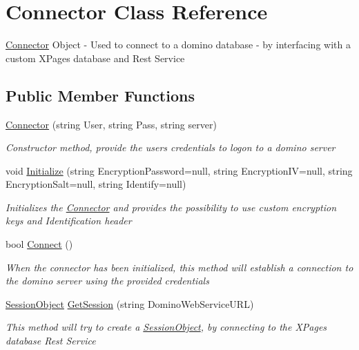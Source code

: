 \hypertarget{class_connector}{}\section{Connector Class Reference}
\label{class_connector}


\mbox{\hyperlink{class_connector}{Connector}} Object -\/ Used to connect to a domino database -\/ by interfacing with a custom X\+Pages database and Rest Service  


\subsection*{Public Member Functions}
\begin{DoxyCompactItemize}
\item 
\mbox{\hyperlink{class_connector_a259c6d94252479cc3028038ebbaa7dc8}{Connector}} (string User, string Pass, string server)
\begin{DoxyCompactList}\small\item\em Constructor method, provide the users credentials to logon to a domino server \end{DoxyCompactList}\item 
void \mbox{\hyperlink{class_connector_a2ceb19719cfc04adc4c2d299e19e1447}{Initialize}} (string Encryption\+Password=null, string Encryption\+IV=null, string Encryption\+Salt=null, string Identify=null)
\begin{DoxyCompactList}\small\item\em Initializes the \mbox{\hyperlink{class_connector}{Connector}} and provides the possibility to use custom encryption keys and Identification header \end{DoxyCompactList}\item 
bool \mbox{\hyperlink{class_connector_a0dcf8f969c37c4306c567417a872329a}{Connect}} ()
\begin{DoxyCompactList}\small\item\em When the connector has been initialized, this method will establish a connection to the domino server using the provided credentials \end{DoxyCompactList}\item 
\mbox{\hyperlink{class_session_object}{Session\+Object}} \mbox{\hyperlink{class_connector_a5d089c1639f255966f00b2b05add0993}{Get\+Session}} (string Domino\+Web\+Service\+U\+RL)
\begin{DoxyCompactList}\small\item\em This method will try to create a \mbox{\hyperlink{class_session_object}{Session\+Object}}, by connecting to the X\+Pages database Rest Service \end{DoxyCompactList}\end{DoxyCompactItemize}
